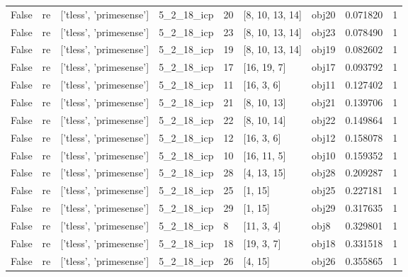 \documentclass[a4paper,table]{article}
\begin{document}
\begin{adjustbox}{max width=\textwidth}
\begin{tabular}{lllllllrl}
   False &         re &  ['tless', 'primesense'] &  5\_2\_18\_icp &       20 &        [8, 10, 13, 14] &    obj20 &     0.071820 &   1 \\
   False &         re &  ['tless', 'primesense'] &  5\_2\_18\_icp &       23 &        [8, 10, 13, 14] &    obj23 &     0.078490 &   1 \\
   False &         re &  ['tless', 'primesense'] &  5\_2\_18\_icp &       19 &        [8, 10, 13, 14] &    obj19 &     0.082602 &   1 \\
   False &         re &  ['tless', 'primesense'] &  5\_2\_18\_icp &       17 &            [16, 19, 7] &    obj17 &     0.093792 &   1 \\
   False &         re &  ['tless', 'primesense'] &  5\_2\_18\_icp &       11 &             [16, 3, 6] &    obj11 &     0.127402 &   1 \\
   False &         re &  ['tless', 'primesense'] &  5\_2\_18\_icp &       21 &            [8, 10, 13] &    obj21 &     0.139706 &   1 \\
   False &         re &  ['tless', 'primesense'] &  5\_2\_18\_icp &       22 &            [8, 10, 14] &    obj22 &     0.149864 &   1 \\
   False &         re &  ['tless', 'primesense'] &  5\_2\_18\_icp &       12 &             [16, 3, 6] &    obj12 &     0.158078 &   1 \\
   False &         re &  ['tless', 'primesense'] &  5\_2\_18\_icp &       10 &            [16, 11, 5] &    obj10 &     0.159352 &   1 \\
   False &         re &  ['tless', 'primesense'] &  5\_2\_18\_icp &       28 &            [4, 13, 15] &    obj28 &     0.209287 &   1 \\
   False &         re &  ['tless', 'primesense'] &  5\_2\_18\_icp &       25 &                [1, 15] &    obj25 &     0.227181 &   1 \\
   False &         re &  ['tless', 'primesense'] &  5\_2\_18\_icp &       29 &                [1, 15] &    obj29 &     0.317635 &   1 \\
   False &         re &  ['tless', 'primesense'] &  5\_2\_18\_icp &        8 &             [11, 3, 4] &     obj8 &     0.329801 &   1 \\
   False &         re &  ['tless', 'primesense'] &  5\_2\_18\_icp &       18 &             [19, 3, 7] &    obj18 &     0.331518 &   1 \\
   False &         re &  ['tless', 'primesense'] &  5\_2\_18\_icp &       26 &                [4, 15] &    obj26 &     0.355865 &   1 \\

\end{tabular}
\end{adjustbox}
\end{document}
